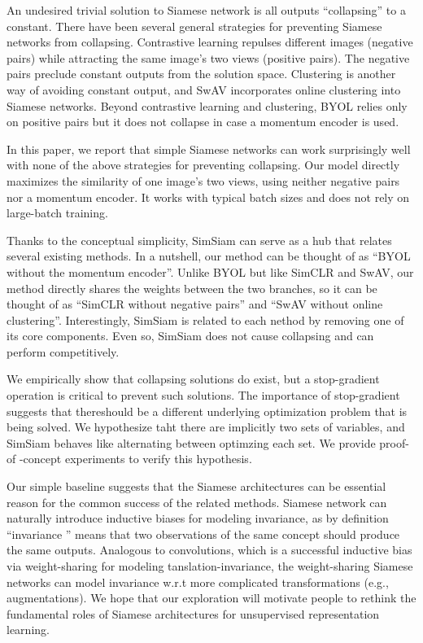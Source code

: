 \documentclass[conference]{IEEEtran}
\begin{document}
An undesired trivial solution to Siamese network is all outputs ``collapsing'' to a constant. There have been several general strategies for preventing Siamese networks from collapsing.
Contrastive learning repulses different images (negative pairs) while attracting the same image's two views (positive pairs).
The negative pairs preclude constant outputs from the solution space. 
Clustering is another way of avoiding constant output, and SwAV incorporates online clustering into Siamese networks. 
Beyond contrastive learning and clustering, BYOL relies only on positive pairs but it does not collapse in case a momentum encoder is used.

In this paper, we report that simple Siamese networks can work surprisingly well with none of the above strategies for preventing collapsing.
Our model directly maximizes the similarity of one image's two views, using neither negative pairs nor a momentum encoder.
It works with typical batch sizes and does not rely on large-batch training.

Thanks to the conceptual simplicity, SimSiam can serve as a hub that relates several existing methods. 
In a nutshell, our method can be thought of as ``BYOL without the momentum encoder''. Unlike BYOL but like SimCLR and SwAV, our method directly shares the weights between the two branches,
so it can be thought of as ``SimCLR without negative pairs'' and ``SwAV without online clustering''.
Interestingly, SimSiam is related to each nethod by removing one of its core components. Even so, SimSiam does not cause collapsing and can perform competitively.

We empirically show that collapsing solutions do exist, but a stop-gradient operation is critical to prevent such solutions.
The importance of stop-gradient suggests that thereshould be a different underlying optimization problem that is being solved.
We hypothesize taht there are implicitly two sets of variables, and SimSiam behaves like alternating between optimzing each set. We provide proof-of -concept experiments to verify this hypothesis.

Our simple baseline suggests that the Siamese architectures can be essential reason for the common success of the related methods.
Siamese network can naturally introduce inductive biases for modeling invariance, as by definition ``invariance '' means that two observations of the same concept should produce the same outputs.
Analogous to convolutions, which is a successful inductive bias via weight-sharing for modeling tanslation-invariance, the weight-sharing Siamese networks can model invariance w.r.t more complicated transformations (e.g., augmentations).
We hope that our exploration will motivate people to rethink the fundamental roles of Siamese architectures for unsupervised representation learning.
\end{document}
